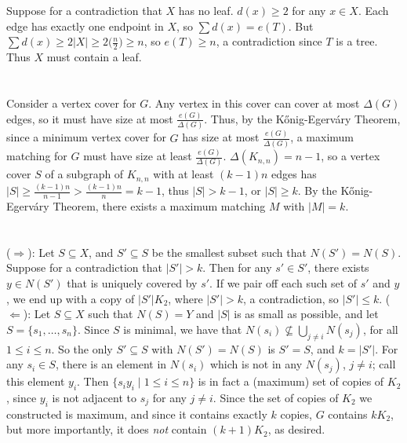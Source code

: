 \documentclass[11pt]{article}
\begin{document}
\section{} %
Suppose for a contradiction that $X$ has no leaf. $d(x)\ge2$ for any $x\in X$.
Each edge has exactly one endpoint in $X$, so $\sum d(x)=e(T)$. But
$\sum d(x)\ge2|X|\ge2\bigl(\frac{n}{2}\bigr)\ge n$, so $e(T)\ge n$, a
contradiction since $T$ is a tree. Thus $X$ must contain a leaf.


\section{} %
Consider a vertex cover for $G$. Any vertex in this cover can cover at most
$\Delta(G)$ edges, so it must have size at most $\frac{e(G)}{\Delta(G)}$.
Thus, by the K\H{o}nig-Egerv\'{a}ry Theorem, since a minimum vertex cover for
$G$ has size at most $\frac{e(G)}{\Delta(G)}$, a maximum matching for $G$ must
have size at least $\frac{e(G)}{\Delta(G)}$.
\newline
\newline
$\Delta(K_{n,n})=n-1$, so a vertex cover $S$ of a subgraph of $K_{n,n}$ with at
least $(k-1)n$ edges has $|S|\ge\frac{(k-1)n}{n-1}>\frac{(k-1)n}{n}=k-1$, thus
$|S|>k-1$, or $|S|\ge k$.  By the K\H{o}nig-Egerv\'{a}ry Theorem, there exists
a maximum matching $M$ with $|M|=k$.


\section{} %
($\Longrightarrow$): Let $S\subseteq X$, and $S'\subseteq S$ be the smallest
subset such that $N(S')=N(S)$. Suppose for a contradiction that $|S'|>k$. Then
for any $s'\in S'$, there exists $y\in N(S')$ that is uniquely covered by $s'$.
If we pair off each such set of $s'$ and $y$, we end up with a copy of
$|S'|K_2$, where $|S'|>k$, a contradiction, so $|S'|\le k$.
\newline
\newline
($\Longleftarrow$): Let $S\subseteq X$ such that $N(S)=Y$ and $|S|$ is as small
as possible, and let $S=\{s_1,\ldots,s_n\}$. Since $S$ is minimal, we have that
$N(s_i)\not\subseteq\bigcup_{j\neq i}N(s_j)$, for all $1\le i\le n$. So the
only $S'\subseteq S$ with $N(S')=N(S)$ is $S'=S$, and $k=|S'|$. For any
$s_i\in S$, there is an element in $N(s_i)$ which is not in any $N(s_j)$,
$j\neq i$; call this element $y_i$. Then $\{s_iy_i\mid1\le i\le n\}$ is in fact
a (maximum) set of copies of $K_2$, since $y_i$ is not adjacent to $s_j$ for
any $j\neq i$.  Since the set of copies of $K_2$ we constructed is maximum, and
since it contains exactly $k$ copies, $G$ contains $kK_2$, but more
importantly, it does \textit{not} contain $(k+1)K_2$, as desired.
\end{document}

